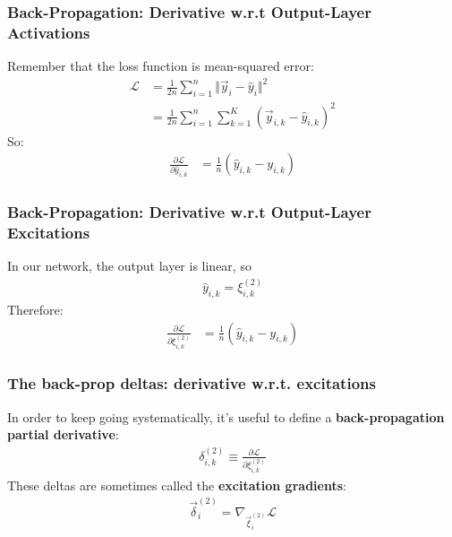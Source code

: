 \documentclass{beamer}
\begin{document}
\begin{frame}
  \frametitle{Back-Propagation: Derivative w.r.t Output-Layer Activations}

  Remember that the loss function  is mean-squared error:
  \begin{align*}
    {\mathcal L}&=\frac{1}{2n}\sum_{i=1}^n \Vert\vec{y}_i-\hat{y}_i\Vert^2\\
    &=\frac{1}{2n}\sum_{i=1}^n\sum_{k=1}^K (\vec{y}_{i,k}-\hat{y}_{i,k})^2
  \end{align*}
  So:
  \begin{align*}
    \frac{\partial\mathcal L}{\partial \hat{y}_{i,k}} &= \frac{1}{n}(\hat{y}_{i,k}-y_{i,k})
  \end{align*}
\end{frame}
  
\begin{frame}
  \frametitle{Back-Propagation: Derivative w.r.t Output-Layer Excitations}

  In our network, the output layer is linear, so
  \begin{align*}
    \hat{y}_{i,k} = \xi_{i,k}^{(2)}
  \end{align*}
  Therefore:
  \begin{align*}
    \frac{\partial\mathcal L}{\partial \xi_{i,k}^{(2)}} &= \frac{1}{n}(\hat{y}_{i,k}-y_{i,k})
  \end{align*}
\end{frame}
  
\begin{frame}
  \frametitle{The back-prop deltas: derivative w.r.t. excitations}

  In order to keep going systematically, it's useful to define a {\bf
    back-propagation partial derivative}:
  \begin{align*}
    \delta_{i,k}^{(2)}\equiv\frac{\partial\mathcal L}{\partial \xi_{i,k}^{(2)}}
  \end{align*}
  These deltas are sometimes called the {\bf excitation gradients}:
  \begin{align*}
    \vec\delta_i^{(2)} = \nabla_{\vec\xi_i^{(2)}}{\mathcal L}
  \end{align*}
\end{frame}
\end{document}
